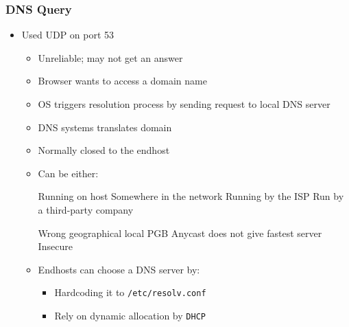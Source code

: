 \subsubsection{DNS Query}
\begin{itemize}
    \item Used UDP on port 53
        \begin{itemize}
            \item Unreliable; may not get an answer
        \end{itemize}
        \begin{itemize}
            \item Browser wants to access a domain name
            \item OS triggers resolution process by sending request to local DNS server
            \item DNS systems translates domain
        \end{itemize}
        \begin{itemize}
            \item Normally closed to the endhost
            \item Can be either:
                \begin{itemize}
                     Running on host
                     Somewhere in the network
                     Running by the ISP
                     Run by a third-party company
                        \begin{itemize}
                            \icon Wrong geographical local
                            \icon PGB Anycast does not give fastest server
                            \icon Insecure
                        \end{itemize}
                \end{itemize}
            \item Endhosts can choose a DNS server by:
                \begin{itemize}
                    \item Hardcoding it to \verb+/etc/resolv.conf+
                    \item Rely on dynamic allocation by \verb+DHCP+
                \end{itemize}
        \end{itemize}
        \begin{itemize}
                \begin{itemize}

\end{itemize}
\end{itemize}
\end{itemize}
